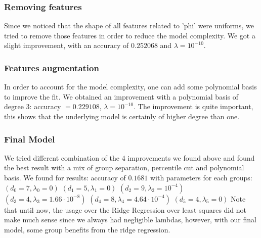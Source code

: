 \documentclass[10pt,conference,compsocconf]{IEEEtran}
\begin{document}
\subsubsection{Removing features}
Since we noticed that the shape of all features related to 'phi' were uniforms,
we tried to remove those features in order to reduce the model complexity. We
got a slight improvement, with an accuracy of $0.252068$ and $\lambda =
10^{-10}$.

\subsubsection{Features augmentation}
In order to account for the model complexity, one can add some polynomial basis
to improve the fit. We obtained an improvement with a polynomial basis of degree
3: accuracy $= 0.229108$, $\lambda = 10^{-10}$. The improvement is quite
important, this shows that the underlying model is certainly of higher degree
than one.

\subsubsection{Final Model}
We tried different combination of the 4 improvements we found above and found
the best result with a mix of group separation, percentile cut and polynomial
basis. We found for results: accuracy of $0.1681$ with parameters for each groups:
$(d_0 = 7, \lambda_0 = 0)$
$(d_1 = 5, \lambda_1 = 0)$
$(d_2 = 9, \lambda_2 = 10^{-4})$
$(d_3 = 4, \lambda_3 = 1.66 \cdot 10^{-8})$
$(d_4 = 8, \lambda_4 = 4.64 \cdot 10^{-4})$
$(d_5 = 4, \lambda_5 = 0)$
Note that until now, the usage over the Ridge Regression over least squares did
not make much sense since we always had negligible lambdas, however, with our
final model, some group benefits from the ridge regression.
\end{document}
